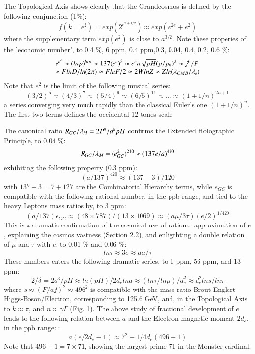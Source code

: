 \documentclass[twoside,draft]{article}
\begin{document}
\begin{sloppypar}
{The Topological Axis shows clearly that the Grandcosmos is defined by the following conjunction (1\%):
\begin{equation}
f(k = e^{2}) = exp(2^{e^{2+1/2}}) \approx exp(e^{2e}+e^{2})
\end{equation}
where the supplementary term $exp(e^2)$ is close to $a^{3/2}$. Note these properies of the 'economic number', to 
0.4 \%, 6 ppm, 0.4 ppm,0.3, 0.04, 0.4, 0.2, 0.6 \%:
$$
\begin{array}{ll}
%
\displaystyle
e^{e^e}\approx (lnp)^{lnp}  
\approx 137 (e^{e})^3 \approx e^e a \sqrt{pH} (p/p_0)^2 \approx j^6/F \\
\approx FlnD/ln(2\pi) \approx FlnF/2 \approx 2WlnZ \approx Zln(\lambdabar_{CMB}/\lambdabar_e) 
\end{array}
$$
Note that $e^2$ is the limit of the following musical series:
$$(3/2)^5 \approx (4/3)^7   \approx (5/4)^9  \approx  (6/5)^{11}  \approx   ...  \approx  (1+1/n)^{2n+1}  $$  
a series converging very much rapidly than the classical Euler's one $(1+1/n)^n$. The first two terms defines the occidental 12 tones scale

The canonical ratio $R_{GC}/\lambdabar_M = 2P^9/a^6pH $ confirms the Extended Holographic Principle, to 0.04 \%:
\begin{equation}
R_{GC}/\lambdabar_M  = (e_{GC}^2)^{210}  \approx (137e/a)^{420}  
\end{equation}
exhibiting the following property (0.3 ppm):
 $$ (a/137)^{420} \approx (137 - 3)/120 $$  
with $137 - 3 = 7 + 127$ are the Combinatorial Hierarchy terms, while $e_{GC}$ is compatible with the following rational number, in the ppb range, and tied to the heavy Leptons mass ratios by, to 3 ppm:
$$(a/137)e_{GC} \approx (48 \times 787)/(13 \times 1069) \approx (a\mu/3\tau) (e/2)^{1/420}$$
This is a dramatic confirmation of the cosmical use of rational approximation of $e$, explaining the cosmos vastness (Section 2.2), and enligthting a double relation of $\mu$ and $\tau$ with $e$, to 0.01 \% and 0.06 \%:
\begin{equation}
ln\tau \approx 3e \approx a\mu/\tau 
\end{equation}
These numbers enters the following dramatic series, to 1 ppm, 56 ppm, and 13 ppm:
\begin{equation}
2/\delta = 2a^3/pH \approx ln(pH)/2d_e lna \approx (ln\tau/ln\mu)/d_e^2 \approx d_e^2 ln s/ln\tau
\end{equation}
where $s \approx (F/af)^2 \approx 496^2 $ is compatible with the mass ratio Brout-Englert-Higgs-Boson/Electron, corresponding to 125.6 GeV, and, in the Topological Axis to $k \approx \pi $, and $n \approx \gamma \Gamma$ (Fig. 1).
The above study of fractional development of $e$ leads to the following relation between $a$ and the Electron magnetic moment $2d_e$, in the ppb range: :$$a(e/2d_e-1) \approx 7^2-1/4d_e(496+1)$$ Note that $496 + 1 = 7 \times 71$, showing the largest prime 71 in the Monster cardinal.


}
\end{sloppypar}
\end{document}

